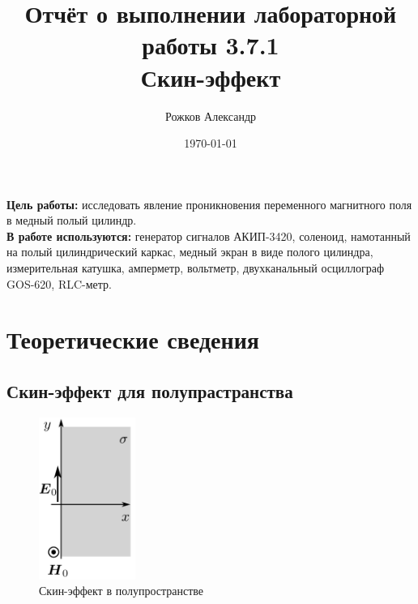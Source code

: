\documentclass{article}
\title{\textbf{Отчёт о выполнении лабораторной  работы 3.7.1} \\
                 Скин-эффект}
\author{Рожков Александр}
\date{\today}
\begin{document}
\maketitle
\newpage

\textbf{Цель работы:} исследовать явление проникновения переменного магнитного поля в медный полый цилиндр. \\

\textbf{В работе используются:} генератор сигналов АКИП-3420, соленоид, намотанный на полый цилиндрический каркас, медный экран в виде полого цилиндра, измерительная катушка, амперметр, вольтметр, двухканальный осциллограф GOS-620, RLC-метр.

\section{Теоретические сведения}
 \subsection{Скин-эффект для полупрастранства}
 \vspace{1cm}

 \begin{figure}
   \begin{center}
     \includegraphics[width=0.28\textwidth]{poluprostranstvo}
   \end{center}
   \caption{Скин-эффект в полупространстве}\label{fig:poluprostranstvo}
 \end{figure}
\end{document}
